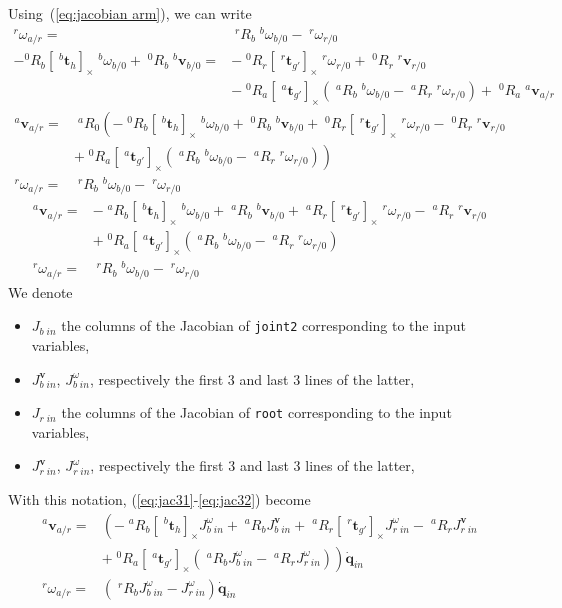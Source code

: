 \documentclass{article}
\newcommand\linvel{\mathbf{v}}
\newcommand\trans{\mathbf{t}}
\newcommand\conf{\mathbf{q}}
\begin{document}
Using~(\ref{eq:jacobian arm}), we can write
\begin{align*}
  ^r\omega_{a/r} =& \;^rR_b\;^b\omega_{b/0} - \;^r\omega_{r/0}\\
  -^0R_b[\;^b\trans_h]_{\times}\;^b\omega_{b/0} + \;^0R_b\;^b\linvel_{b/0} =&
  -\;^0R_r[\;^r\trans_{g'}]_{\times}\;^r\omega_{r/0} + \;^0R_r\;^r\linvel_{r/0} \\ &-\;^0R_a[\;^a\trans_{g'}]_{\times} (\;^aR_b\;^b\omega_{b/0} - \;^aR_{r}\;^r\omega_{r/0}) + \;^0R_a\;^a\linvel_{a/r}
\end{align*}
\begin{align*}
  ^a\linvel_{a/r} =& \;^aR_0\left(
  -\;^0R_b[\;^b\trans_h]_{\times}\;^b\omega_{b/0} + \;^0R_b\;^b\linvel_{b/0}
  +\;^0R_r[\;^r\trans_{g'}]_{\times}\;^r\omega_{r/0} - \;^0R_r\;^r\linvel_{r/0} \right.\\
  &\left.+\;^0R_a[\;^a\trans_{g'}]_{\times} (\;^aR_b\;^b\omega_{b/0} - \;^aR_{r}\;^r\omega_{r/0})  \right)\\
  ^r\omega_{a/r} =& \;^rR_b\;^b\omega_{b/0} - \;^r\omega_{r/0}
\end{align*}
\begin{align}
  ^a\linvel_{a/r} =&
  -\;^aR_b[\;^b\trans_h]_{\times}\;^b\omega_{b/0} + \;^aR_b\;^b\linvel_{b/0}
  +\;^aR_r[\;^r\trans_{g'}]_{\times}\;^r\omega_{r/0} - \;^aR_r\;^r\linvel_{r/0}\\
  \label{eq:jac31}
  &+\;^0R_a[\;^a\trans_{g'}]_{\times} (\;^aR_b\;^b\omega_{b/0} - \;^aR_{r}\;^r\omega_{r/0})\\
  \label{eq:jac32}
  ^r\omega_{a/r} =& \;^rR_b\;^b\omega_{b/0} - \;^r\omega_{r/0}
\end{align}
We denote
\begin{itemize}
\item $J_{b\;in}$ the columns of the Jacobian of \texttt{joint2} corresponding to the input variables,
\item $J_{b\;in}^{\linvel}$, $J_{b\;in}^{\omega}$, respectively the first 3 and last 3 lines of the latter,
\item $J_{r\;in}$ the columns of the Jacobian of \texttt{root} corresponding to the input variables,
\item $J_{r\;in}^{\linvel}$, $J_{r\;in}^{\omega}$, respectively the first 3 and last 3 lines of the latter,
\end{itemize}
With this notation, (\ref{eq:jac31}-\ref{eq:jac32}) become
\begin{align*}
  ^a\linvel_{a/r} =&
  \left(-\;^aR_b[\;^b\trans_h]_{\times}J_{b\;in}^{\omega} + \;^aR_bJ_{b\;in}^{\linvel}
  +\;^aR_r[\;^r\trans_{g'}]_{\times}J_{r\;in}^{\omega} - \;^aR_rJ_{r\;in}^{\linvel}\right.\\
  &\left.+\;^0R_a[\;^a\trans_{g'}]_{\times} (\;^aR_bJ_{b\;in}^{\omega} - \;^aR_{r}J_{r\;in}^{\omega})\right)\dot{\conf}_{in}\\
  ^r\omega_{a/r} =& \left(\;^rR_bJ_{b\;in}^{\omega} - J_{r\;in}^{\omega}\right)\dot{\conf}_{in}
\end{align*}
\end{document}
